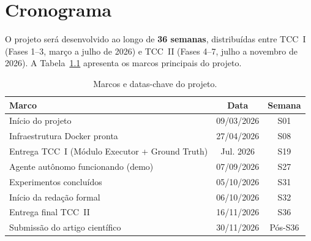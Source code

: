 \documentclass[
    12pt,
    openany,
    oneside,
    a4paper,
    brazil
]{abntex2}
\begin{document}
\chapter{Cronograma}

O projeto será desenvolvido ao longo de \textbf{36 semanas},
distribuídas entre TCC~I (Fases 1--3, março a julho de 2026) e TCC~II
(Fases 4--7, julho a novembro de 2026). A Tabela~\ref{tab:cronograma}
apresenta os marcos principais do projeto.

\begin{table}[htb]
\centering
\caption{Marcos e datas-chave do projeto.\label{tab:cronograma}}
\begin{tabular}{lcc}
\toprule
\textbf{Marco} & \textbf{Data} & \textbf{Semana} \\
\midrule
Início do projeto                              & 09/03/2026  & S01      \\
Infraestrutura Docker pronta                   & 27/04/2026  & S08      \\
Entrega TCC~I (Módulo Executor + Ground Truth) & Jul. 2026   & S19      \\
Agente autônomo funcionando (demo)             & 07/09/2026  & S27      \\
Experimentos concluídos                        & 05/10/2026  & S31      \\
Início da redação formal                       & 06/10/2026  & S32      \\
Entrega final TCC~II                           & 16/11/2026  & S36      \\
Submissão do artigo científico                 & 30/11/2026  & Pós-S36  \\
\bottomrule
\end{tabular}
\end{table}

\postextual


\end{document}
